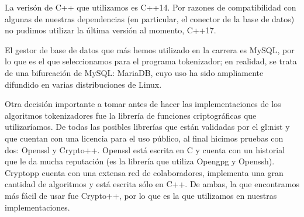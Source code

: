La verisón de C++ que utilizamos es C++14. Por razones de compatibilidad con
algunas de nuestras dependencias (en particular, el conector de la base de
datos) no pudimos utilizar la última versión al momento, C++17.

El gestor de base de datos que más hemos utilizado en la carrera es MySQL,
por lo que es el que seleccionamos para el programa tokenizador; en realidad,
se trata de una bifurcación de MySQL: MariaDB, cuyo uso ha sido ampliamente
difundido en varias distribuciones de Linux.

Otra decisión importante a tomar antes de hacer las implementaciones de los
algoritmos tokenizadores fue la librería de funciones criptográficas que
utilizaríamos. De todas las posibles librerías que están validadas
por el \gls{gl:nist} y que cuentan con una licencia para el uso público, al
final hicimos pruebas con dos: Openssl y Crypto++. Openssl está escrita
en C y cuenta con un historial que le da mucha reputación (es la librería
que utiliza Opengpg y Openssh). Cryptopp cuenta con una extensa red de
colaboradores, implementa una gran cantidad de algoritmos y está escrita sólo
en C++. De ambas, la que encontramos más fácil de usar fue Crypto++, por lo que
es la que utilizamos en nuestras implementaciones.

